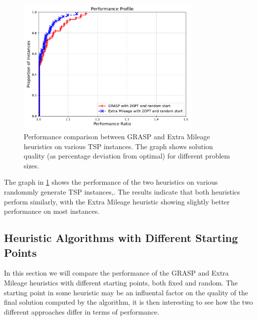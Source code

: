 \documentclass{article}
\begin{document}
\begin{figure}[!ht]
	\centering
	\includegraphics[width=0.8\textwidth]{plots/grasp_vs_extra.pdf}
	\caption{Performance comparison between GRASP and Extra Mileage heuristics on various TSP instances. The graph shows solution quality (as percentage deviation from optimal) for different problem sizes.}
	\label{fig:grasp_vs_extra_mileage}
\end{figure}

The graph in \ref{fig:grasp_vs_extra_mileage} shows the performance of the two heuristics on various randommly generate TSP instances,. 
The results indicate that both heuristics perform similarly, with the Extra Mileage heuristic showing slightly better performance on most instances.


\subsection{Heuristic Algorithms with Different Starting Points}
In this section we will compare the performance of the GRASP and Extra Mileage heuristics with different starting points,
both fixed and random. The starting point in some heuristic may be an influental factor on the quality of the final solution computed by the algorithm, 
it is then interesting to see how the two different approaches differ in terms of performance.
\end{document}
